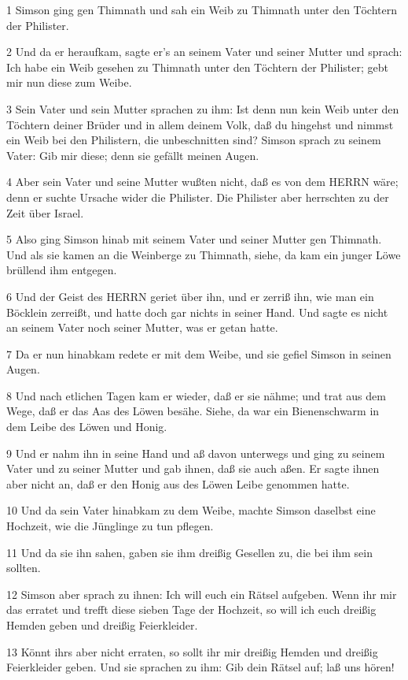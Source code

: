\par 1 Simson ging gen Thimnath und sah ein Weib zu Thimnath unter den Töchtern der Philister.
\par 2 Und da er heraufkam, sagte er's an seinem Vater und seiner Mutter und sprach: Ich habe ein Weib gesehen zu Thimnath unter den Töchtern der Philister; gebt mir nun diese zum Weibe.
\par 3 Sein Vater und sein Mutter sprachen zu ihm: Ist denn nun kein Weib unter den Töchtern deiner Brüder und in allem deinem Volk, daß du hingehst und nimmst ein Weib bei den Philistern, die unbeschnitten sind? Simson sprach zu seinem Vater: Gib mir diese; denn sie gefällt meinen Augen.
\par 4 Aber sein Vater und seine Mutter wußten nicht, daß es von dem HERRN wäre; denn er suchte Ursache wider die Philister. Die Philister aber herrschten zu der Zeit über Israel.
\par 5 Also ging Simson hinab mit seinem Vater und seiner Mutter gen Thimnath. Und als sie kamen an die Weinberge zu Thimnath, siehe, da kam ein junger Löwe brüllend ihm entgegen.
\par 6 Und der Geist des HERRN geriet über ihn, und er zerriß ihn, wie man ein Böcklein zerreißt, und hatte doch gar nichts in seiner Hand. Und sagte es nicht an seinem Vater noch seiner Mutter, was er getan hatte.
\par 7 Da er nun hinabkam redete er mit dem Weibe, und sie gefiel Simson in seinen Augen.
\par 8 Und nach etlichen Tagen kam er wieder, daß er sie nähme; und trat aus dem Wege, daß er das Aas des Löwen besähe. Siehe, da war ein Bienenschwarm in dem Leibe des Löwen und Honig.
\par 9 Und er nahm ihn in seine Hand und aß davon unterwegs und ging zu seinem Vater und zu seiner Mutter und gab ihnen, daß sie auch aßen. Er sagte ihnen aber nicht an, daß er den Honig aus des Löwen Leibe genommen hatte.
\par 10 Und da sein Vater hinabkam zu dem Weibe, machte Simson daselbst eine Hochzeit, wie die Jünglinge zu tun pflegen.
\par 11 Und da sie ihn sahen, gaben sie ihm dreißig Gesellen zu, die bei ihm sein sollten.
\par 12 Simson aber sprach zu ihnen: Ich will euch ein Rätsel aufgeben. Wenn ihr mir das erratet und trefft diese sieben Tage der Hochzeit, so will ich euch dreißig Hemden geben und dreißig Feierkleider.
\par 13 Könnt ihrs aber nicht erraten, so sollt ihr mir dreißig Hemden und dreißig Feierkleider geben. Und sie sprachen zu ihm: Gib dein Rätsel auf; laß uns hören!
